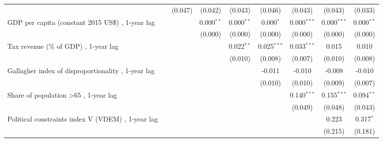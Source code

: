 \begin{table}[htbp]
\begin{tabular}{lcccccccc}
                                                                                              &         & (0.047)      & (0.042)      & (0.043)       & (0.046)       & (0.043)       & (0.043)       & (0.033)\\   
      GDP per capita (constant 2015 US\$) , 1-year lag                                        &         &              & 0.000$^{**}$ & 0.000$^{**}$  & 0.000$^{*}$   & 0.000$^{***}$ & 0.000$^{***}$ & 0.000$^{**}$\\   
                                                                                              &         &              & (0.000)      & (0.000)       & (0.000)       & (0.000)       & (0.000)       & (0.000)\\   
      Tax revenue (\% of GDP) , 1-year lag                                                    &         &              &              & 0.022$^{**}$  & 0.025$^{***}$ & 0.033$^{***}$ & 0.015         & 0.010\\   
                                                                                              &         &              &              & (0.010)       & (0.008)       & (0.007)       & (0.010)       & (0.008)\\   
      Gallagher index of disproportionality , 1-year lag                                      &         &              &              &               & -0.011        & -0.010        & -0.008        & -0.010\\   
                                                                                              &         &              &              &               & (0.010)       & (0.010)       & (0.009)       & (0.007)\\   
      Share of population >65 , 1-year lag                                                    &         &              &              &               &               & 0.140$^{***}$ & 0.155$^{***}$ & 0.094$^{**}$\\   
                                                                                              &         &              &              &               &               & (0.049)       & (0.048)       & (0.043)\\   
      Political constraints index V (VDEM) , 1-year lag                                       &         &              &              &               &               &               & 0.223         & 0.317$^{*}$\\   
                                                                                              &         &              &              &               &               &               & (0.215)       & (0.181)\\   

\end{tabular}
\end{table}
